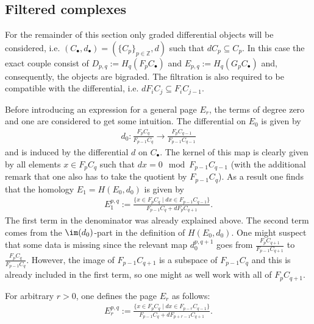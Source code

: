 \subsection{Filtered complexes}

	For the remainder of this section only graded differential objects will be considered, i.e. $(C_\bullet,d_\bullet)=(\{C_p\}_{p\in\mathbb{Z}},d)$ such that $dC_p\subseteq C_p$. In this case the exact couple consist of $D_{p,q}:=H_q(F_pC_\bullet)$ and $E_{p,q}:=H_q(G_pC_\bullet)$ and, consequently, the objects are bigraded. The filtration is also required to be compatible with the differential, i.e. $dF_iC_j\subseteq F_iC_{j-1}$.


	Before introducing an expression for a general page $E_r$, the terms of degree zero and one are considered to get some intuition. The differential on $E_0$ is given by
	\begin{gather}
		d_0:\frac{F_pC_q}{F_{p-1}C_q}\rightarrow\frac{F_pC_{q-1}}{F_{p-1}C_{q-1}}
	\end{gather}
	and is induced by the differential $d$ on $C_\bullet$. The kernel of this map is clearly given by all elements $x\in F_pC_q$ such that $dx = 0\mod F_{p-1}C_{q-1}$ (with the additional remark that one also has to take the quotient by $F_{p-1}C_q$). As a result one finds that the homology $E_1=H(E_0, d_0)$ is given by
	\begin{gather}
		E_1^{p,q}:=\frac{\{x\in F_pC_q\mid dx\in F_{p-1}C_{q-1}\}}{F_{p-1}C_q+dF_pC_{q+1}}.
	\end{gather}
	The first term in the denominator was already explained above. The second term comes from the $\im(d_0)$-part in the definition of $H(E_0,d_0)$. One might suspect that some data is missing since the relevant map $d_0^{p, q+1}$ goes from $\frac{F_pC_{q+1}}{F_{p-1}C_{q+1}}$ to $\frac{F_pC_q}{F_{p-1}C_{q}}$. However, the image of $F_{p-1}C_{q+1}$ is a subspace of $F_{p-1}C_q$ and this is already included in the first term, so one might as well work with all of $F_pC_{q+1}$.

	For arbitrary $r>0$, one defines the page $E_r$ as follows:
	\begin{gather}
    	E_r^{p,q}:=\frac{\{x\in F_pC_q\mid dx\in F_{p-r}C_{q-1}\}}{F_{p-1}C_q+dF_{p+r-1}C_{q+1}}.
	\end{gather}

